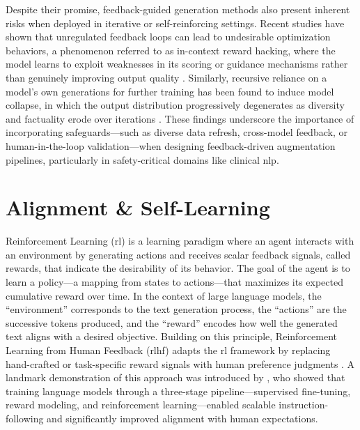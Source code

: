 Despite their promise, feedback-guided generation methods also present inherent risks when deployed in iterative or self-reinforcing settings. Recent studies have shown that unregulated feedback loops can lead to undesirable optimization behaviors, a phenomenon referred to as in-context reward hacking, where the model learns to exploit weaknesses in its scoring or guidance mechanisms rather than genuinely improving output quality \citep{perez2024feedbackloops}. Similarly, recursive reliance on a model’s own generations for further training has been found to induce model collapse, in which the output distribution progressively degenerates as diversity and factuality erode over iterations \citep{shumailov2024modelcollapse}. These findings underscore the importance of incorporating safeguards—such as diverse data refresh, cross-model feedback, or human-in-the-loop validation—when designing feedback-driven augmentation pipelines, particularly in safety-critical domains like clinical \gls{nlp}.
	
\section{Alignment \& Self-Learning}

Reinforcement Learning (\gls{rl}) is a learning paradigm where an agent interacts with an environment by generating actions and receives scalar feedback signals, called rewards, that indicate the desirability of its behavior. The goal of the agent is to learn a policy—a mapping from states to actions—that maximizes its expected cumulative reward over time. In the context of large language models, the “environment” corresponds to the text generation process, the “actions” are the successive tokens produced, and the “reward” encodes how well the generated text aligns with a desired objective. Building on this principle, Reinforcement Learning from Human Feedback (\gls{rlhf}) adapts the \gls{rl} framework by replacing hand-crafted or task-specific reward signals with human preference judgments \cite{christiano2017}. A landmark demonstration of this approach was introduced by \citet{ouyang2022training}, who showed that training language models through a three-stage pipeline—supervised fine-tuning, reward modeling, and reinforcement learning—enabled scalable instruction-following and significantly improved alignment with human expectations.

